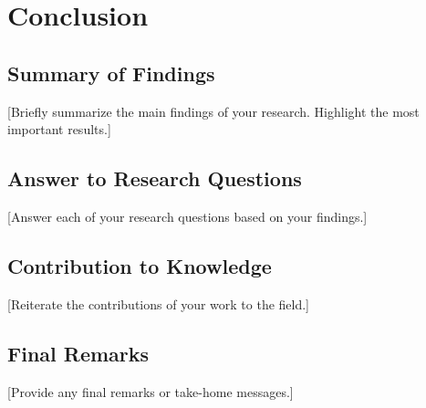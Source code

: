
\section{Conclusion}
\label{sec:conclusion}

\subsection{Summary of Findings}
[Briefly summarize the main findings of your research. Highlight the most important results.]

\subsection{Answer to Research Questions}
[Answer each of your research questions based on your findings.]

\subsection{Contribution to Knowledge}
[Reiterate the contributions of your work to the field.]

\subsection{Final Remarks}
[Provide any final remarks or take-home messages.]

\begin{acknowledgments}
\end{acknowledgments}

